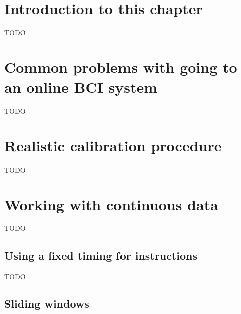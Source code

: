 \section{Introduction to this chapter}
\label{sec:online_bci_system_introduction}

TODO

\section{Common problems with going to an online BCI system}
\label{sec:online_bci_system_common_problems}

TODO

\section{Realistic calibration procedure}
\label{sec:online_bci_system_common_calibration}

TODO

\section{Working with continuous data}
\label{sec:online_bci_system_continous_data}

TODO


\subsection{Using a fixed timing for instructions}
\label{subsec:online_bci_system_continous_data_fixed_timing}

TODO


\subsection{Sliding windows}
\label{subsec:online_bci_system_continous_data_sliding_window}

